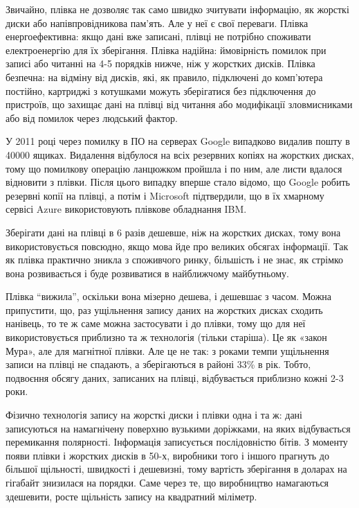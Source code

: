 \documentclass[a4paper,14pt]{extreport}
\begin{document}
Звичайно, плівка не дозволяє так само швидко зчитувати інформацію, як жорсткі диски або напівпровідникова пам'ять. Але у неї є свої переваги. Плівка енергоефективна: якщо дані вже записані, плівці не потрібно споживати електроенергію для їх зберігання. Плівка надійна: ймовірність помилок при записі або читанні на 4-5 порядків нижче, ніж у жорстких дисків. Плівка безпечна: на відміну від дисків, які, як правило, підключені до комп'ютера постійно, картриджі з котушками можуть зберігатися без підключення до пристроїв, що захищає дані на плівці від читання або модифікації зловмисниками або від помилок через людський фактор.\par

У 2011 році через помилку в ПО на серверах Google випадково видалив пошту в 40000 ящиках. Видалення відбулося на всіх резервних копіях на жорстких дисках, тому що помилкову операцію ланцюжком пройшла і по ним, але листи вдалося відновити з 
плівки. Після цього випадку вперше стало відомо, що Google робить  резервні копії на плівці, а потім і Microsoft підтвердили, що в їх хмарному сервісі Azure використовують плівкове обладнання IBM.\par

Зберігати дані на плівці в 6 разів дешевше, ніж на жорстких дисках, тому вона використовується повсюдно, якщо мова йде про великих обсягах інформації. Так як плівка практично зникла з споживчого ринку, більшість і не знає, як стрімко вона розвивається і буде розвиватися в найближчому майбутньому.\par

Плівка \textquotedblleft вижила\textquotedblright, оскільки вона мізерно дешева, і дешевшає з часом. Можна припустити, що, раз ущільнення запису даних на жорстких дисках сходить нанівець, то те ж саме можна застосувати і до плівки, тому що для неї використовується приблизно та ж технологія (тільки старіша). Це як «закон Мура», але для магнітної плівки. Але це не так: з роками темпи ущільнення записи на плівці не спадають, а зберігаються в районі 33\% в рік. Тобто, подвоєння обсягу даних, записаних на плівці, відбувається приблизно кожні 2-3 роки.

Фізично технологія запису на жорсткі диски і плівки одна і та ж: дані записуються на намагнічену поверхню вузькими доріжками, на яких відбувається перемикання полярності. Інформація записується послідовністю бітів. З моменту появи плівки і жорстких дисків в 50-х, виробники того і іншого прагнуть до більшої щільності, швидкості і дешевизні, тому вартість зберігання в доларах на гігабайт знизилася на порядки. Саме через те, що виробництво намагаються здешевити, росте щільність запису на квадратний міліметр.\par
\end{document}
